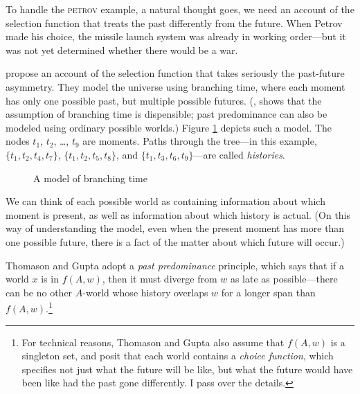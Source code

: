 To handle the \textsc{petrov} example, a natural thought goes, we need an account of the selection function that treats the past differently from the future. When Petrov made his choice, the missile launch system was already in working order---but it was not yet determined whether there would be a war.

\citet{Thomason1980-THOATO-4} propose an account of the selection function that takes seriously the past-future asymmetry.  They model the universe using branching time, where each moment has only one possible past, but multiple possible futures.  (\citealp{Cross1990-CROTNA}, shows that the assumption of branching time is dispensible; past predominance can also be modeled using ordinary possible worlds.)  Figure \ref{fig-branching-time} depicts such a model. The nodes $t_1$, $t_2$, \ldots, $t_9$ are moments.  Paths through the tree---in this example, $\{t_1, t_2, t_4, t_7\}$, $\{t_1, t_2, t_5, t_8\}$, and $\{t_1, t_3, t_6, t_9\}$---are called \emph{histories}.

\begin{figure}
\centering
{}
\caption{A model of branching time}
\label{fig-branching-time}
\end{figure}

We can think of each possible world as containing information about which moment is present, as well as information about which history is actual.  (On this way of understanding the model, even when the present moment has more than one possible future, there is a fact of the matter about which future will occur.)

Thomason and Gupta adopt a \emph{past predominance} principle, which says that if a world $x$ is in $f(A, w)$, then it must diverge from $w$ as late as possible---there can be no other $A$-world whose history overlaps $w$ for a longer span than $f(A, w)$.\footnote{For technical reasons, Thomason and Gupta also assume that $f(A, w)$ is a singleton set, and posit that each world contains a \emph{choice function}, which specifies not just what the future will be like, but what the future would have been like had the past gone differently.  I pass over the details.}

